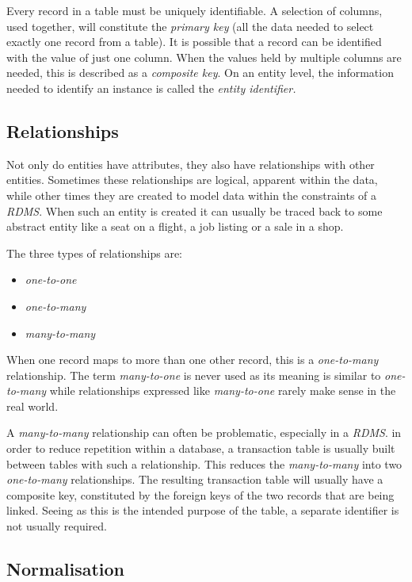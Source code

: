 \documentclass[9pt]{article}
\begin{document}
Every record in a table must be uniquely identifiable. A selection of columns, used together, will constitute the \emph{primary key} (all the data needed to select exactly one record from a table). It is possible that a record can be identified with the value of just one column. When the values held by multiple columns are needed, this is described as a \emph{composite key}. On an entity level, the information needed to identify an instance is called the \emph{entity identifier.}

\subsection{Relationships}
\label{sec:orga1cd30d}

Not only do entities have attributes, they also have relationships with other entities. Sometimes these relationships are logical, apparent within the data, while other times they are created to model data within the constraints of a \emph{RDMS}. When such an entity is created it can usually be traced back to some abstract entity like a seat on a flight, a job listing or a sale in a shop.

The three types of relationships are:

\begin{itemize}
\item \emph{one-to-one}
\item \emph{one-to-many}
\item \emph{many-to-many}
\end{itemize}

When one record maps to more than one other record, this is a \emph{one-to-many} relationship. The term \emph{many-to-one} is never used as its meaning is similar to \emph{one-to-many} while relationships expressed like \emph{many-to-one} rarely make sense in the real world.

A \emph{many-to-many} relationship can often be problematic, especially in a \emph{RDMS}. in order to reduce repetition within a database, a transaction table is usually built between tables with such a relationship. This reduces the \emph{many-to-many} into two \emph{one-to-many} relationships. The resulting transaction table will usually have a composite key, constituted by the foreign keys of the two records that are being linked. Seeing as this is the intended purpose of the table, a separate identifier is not usually required.

\subsection{Normalisation}
\label{sec:orgc28cc49}
\end{document}
